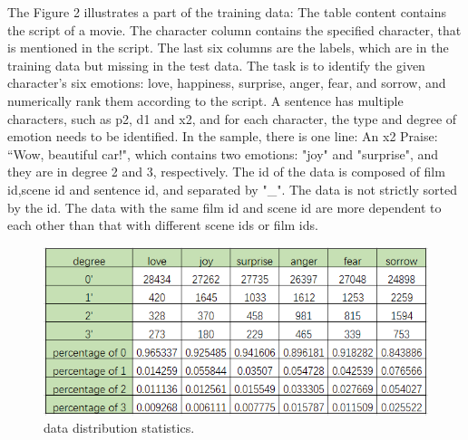 \documentclass[12pt,twocolumn,letterpaper]{article}
\begin{document}
The Figure 2 illustrates a part of the training data: The table content contains the script of a movie. The character column contains the specified character, that is mentioned in the script. The last six columns are the labels, which are in the training data but missing in the test data. The task is to identify the given character’s six emotions: love, happiness, surprise, anger, fear, and sorrow, and numerically rank them according to the script. A sentence has multiple characters, such as p2, d1 and x2, and for each character, the type and degree of emotion needs to be identified. In the sample, there is one line: An x2 Praise: “Wow, beautiful car!", which contains two emotions: "joy" and "surprise", and they are in degree 2 and 3, respectively. The id of the data is composed of film id,scene id and sentence id, and separated by "\_". The data is not strictly sorted by the id. The data with the same film id and scene id are more dependent to each other than that with different scene ids or film ids.
\begin{figure}
\begin{center}
\includegraphics[scale=0.6]{data distribution.png}
\end{center}
   \caption{data distribution statistics.}
\label{fig:short}
\end{figure}
\end{document}
